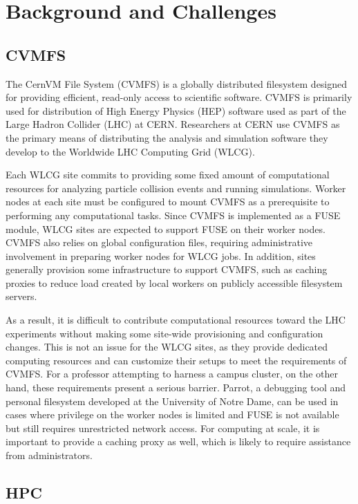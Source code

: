 \documentclass[conference]{IEEEtran}
\begin{document}

\section{Background and Challenges}

\subsection{CVMFS}
The CernVM File System (CVMFS) is a globally distributed filesystem designed for providing efficient,
read-only access to scientific software.
CVMFS is primarily used for distribution of High Energy Physics (HEP) software used as part of the Large Hadron Collider (LHC) at CERN.
Researchers at CERN use CVMFS as the primary means of distributing the analysis and simulation software they develop to the Worldwide LHC Computing Grid (WLCG).

Each WLCG site commits to providing some fixed amount of computational resources for analyzing particle collision events and running simulations.
Worker nodes at each site must be configured to mount CVMFS as a prerequisite to performing any computational tasks.
Since CVMFS is implemented as a FUSE module,
WLCG sites are expected to support FUSE on their worker nodes.
CVMFS also relies on global configuration files,
requiring administrative involvement in preparing worker nodes for WLCG jobs.
In addition, sites generally provision some infrastructure to support CVMFS,
such as caching proxies to reduce load created by local workers on publicly accessible filesystem servers.

As a result, it is difficult to contribute computational resources toward the LHC experiments without making some site-wide provisioning and configuration changes.
This is not an issue for the WLCG sites,
as they provide dedicated computing resources and can customize their setups to meet the requirements of CVMFS.
For a professor attempting to harness a campus cluster,
on the other hand, these requirements present a serious barrier.
Parrot, a debugging tool and personal filesystem developed at the University of Notre Dame,
can be used in cases where privilege on the worker nodes is limited and FUSE is not available but still requires unrestricted network access.
For computing at scale, it is important to provide a caching proxy as well,
which is likely to require assistance from administrators.

\subsection{HPC}
\end{document}

